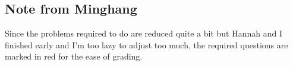 \documentclass[
    classnum=MATH564,
    classname=MATHEMATICAL\ MODELING,
    due=March\ 26\,\ 2020,
    author=Hannah\ Wu\qquad\ Minghang\ Li,
    authorshort=Wu\ \&\ Li,
    teacher= Zachary\ M.\ Boyd,
    hw=4
]{../hw-template}
\begin{document}
\begin{tcolorbox}
\subsection{Note from Minghang}
Since the problems required to do are reduced quite a bit but Hannah and I finished early and I'm too lazy to adjust too much, the required questions are marked in {\color{red} red} for the ease of grading. 
\end{tcolorbox}


\pagebreak


\pagebreak


\pagebreak


\pagebreak
\end{document}
